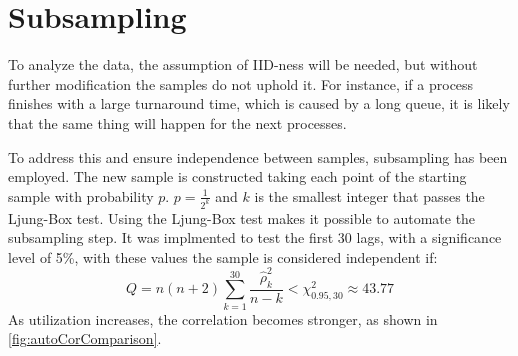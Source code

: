 

\section{Subsampling}

To analyze the data, the assumption of IID-ness will be needed, but without further modification the samples do not uphold it.
For instance, if a process finishes with a large turnaround time, which is caused by a long queue, it is likely that the same thing will happen for the next processes.

To address this and ensure independence between samples, subsampling has been employed. The new sample is constructed taking each point of the starting sample with probability $p$.
$p = \frac{1}{2^k}$ and $k$ is the smallest integer that passes the Ljung-Box test.
Using the Ljung-Box test makes it possible to automate the subsampling step. It was implmented to test the first 30 lags, with a significance level of 5\%, with these values the sample is considered independent if:
\vspace{-0.5\baselineskip}
\begin{equation}
    Q = n(n+2) \sum_{k=1}^{30} \frac{\hat{\rho}_k^2}{n-k} < \chi^2_{0.95,30} \approx 43.77
\end{equation}
As utilization increases, the correlation becomes stronger, as shown in \cref{fig:autoCorComparison}.


